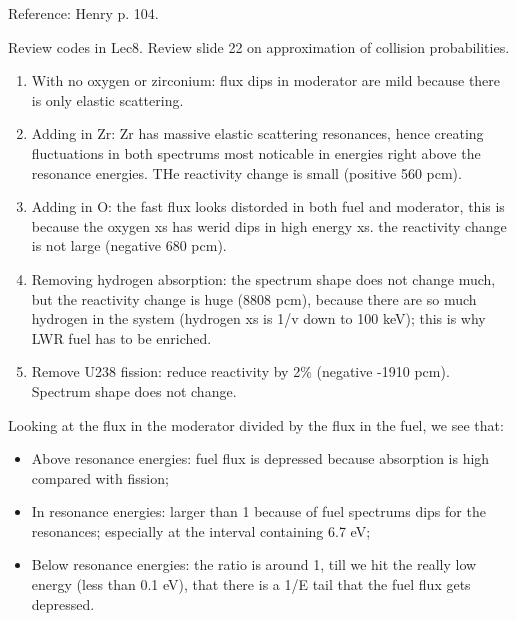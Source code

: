 \documentclass{school-22.211-notes}
\date{March  7, 2012}
\begin{document}
\maketitle



Reference: Henry p. 104. 

Review codes in Lec8. Review slide 22 on approximation of collision probabilities. 

\begin{enumerate}
\item With no oxygen or zirconium: flux dips in moderator are mild because there is only elastic scattering. 
\item Adding in Zr: Zr has massive elastic scattering resonances, hence creating fluctuations in both spectrums most noticable in energies right above the resonance energies. THe reactivity change is small (positive 560 pcm).
\item Adding in O: the fast flux looks distorded in both fuel and moderator, this is because the oxygen xs has werid dips in high energy xs. the reactivity change is not large (negative 680 pcm). 
\item Removing hydrogen absorption: the spectrum shape does not change much, but the reactivity change is huge (8808 pcm), because there are so much hydrogen in the system (hydrogen xs is 1/v down to 100 keV); this is why LWR fuel has to be enriched. 
\item Remove U238 fission: reduce reactivity by 2\% (negative -1910 pcm). Spectrum shape does not change. 
\end{enumerate}
Looking at the flux in the moderator divided by the flux in the fuel, we see that:
\begin{itemize}
\item Above resonance energies: fuel flux is depressed because absorption is high compared with fission; 
\item In resonance energies: larger than 1 because of fuel spectrums dips for the resonances; especially at the interval containing 6.7 eV;
\item Below resonance energies: the ratio is around 1, till we hit the really low energy (less than 0.1 eV), that there is a 1/E tail that the fuel flux gets depressed. 
\end{itemize}
\end{document}
